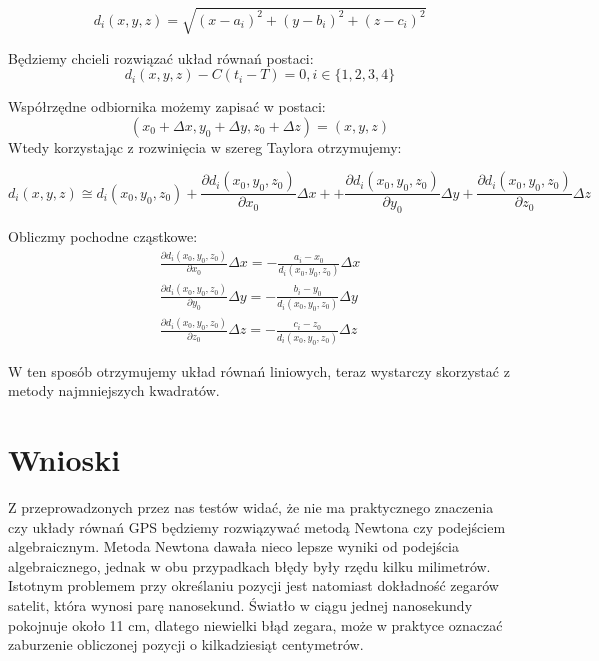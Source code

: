 \documentclass[]{mwart}
\theoremstyle{definition}
\begin{document}
\begin{equation*}
	d_i(x, y, z) = \sqrt{(x - a_i)^2 + (y - b_i)^2 + (z - c_i)^2}
\end{equation*}

Będziemy chcieli rozwiązać układ równań postaci:
\begin{equation*}
	d_i(x,y,z) - C(t_i-T) = 0, i \in \{1,2,3,4\}
\end{equation*}

Współrzędne odbiornika możemy zapisać w postaci:
$$(x_0 + \Delta x,y_0 + \Delta y, z_0 + \Delta z) = (x, y, z)$$
Wtedy korzystając z rozwinięcia w szereg Taylora otrzymujemy:

\begin{dmath*}
	d_i(x,y,z) \cong d_i(x_0, y_0, z_0) + \frac{\partial d_i(x_0, y_0, z_0)}{\partial x_0}\Delta x + + \frac{\partial d_i(x_0, y_0, z_0)}{\partial y_0}\Delta y + \frac{\partial d_i(x_0, y_0, z_0)}{\partial z_0}\Delta z
\end{dmath*}

Obliczmy pochodne cząstkowe:
\begin{align*}
	\frac{\partial d_i(x_0, y_0, z_0)}{\partial x_0}\Delta x = - \frac{a_i-x_0}{d_i(x_0, y_0, z_0)}\Delta x \\
	\frac{\partial d_i(x_0, y_0, z_0)}{\partial y_0}\Delta y = - \frac{b_i-y_0}{d_i(x_0, y_0, z_0)}\Delta y \\
	\frac{\partial d_i(x_0, y_0, z_0)}{\partial z_0}\Delta z = - \frac{c_i-z_0}{d_i(x_0, y_0, z_0)}\Delta z
\end{align*}

W ten sposób otrzymujemy układ równań liniowych, teraz wystarczy skorzystać z metody najmniejszych kwadratów\cite{nptel}.

\section*{Wnioski}
Z przeprowadzonych przez nas testów widać, że nie ma praktycznego znaczenia czy układy równań GPS będziemy rozwiązywać metodą Newtona czy podejściem algebraicznym. Metoda Newtona dawała nieco lepsze wyniki od podejścia algebraicznego, jednak w obu przypadkach błędy były rzędu kilku milimetrów. Istotnym problemem przy określaniu pozycji jest natomiast dokładność zegarów satelit, która wynosi parę nanosekund. Światło w ciągu jednej nanosekundy pokojnuje około 11 cm, dlatego niewielki błąd zegara, może w praktyce oznaczać zaburzenie obliczonej pozycji o kilkadziesiąt centymetrów.

\end{document}
